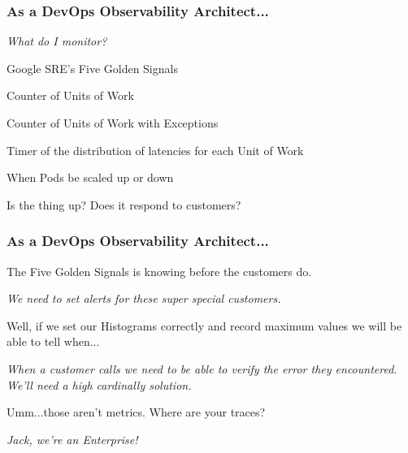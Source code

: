 
\begin{frame}
    \frametitle{As a DevOps Observability Architect...}

    \begin{quotebox}
    \emph{What do I monitor?}
    \end{quotebox}

    Google SRE's  Five Golden Signals
    \begin{description}[labelwidth=\widthof{Saturation}]
        \item[Traffic] Counter of Units of Work
        \item[Errors] Counter of Units of Work with Exceptions
        \item[Latency] Timer of the distribution of latencies for each Unit of Work
        \item[Saturation] When Pods be scaled up or down
        \item[Health] Is the thing up?  Does it respond to customers?
    \end{description}
\end{frame}

\begin{frame}
    \frametitle{As a DevOps Observability Architect...}

    The  Five Golden Signals is knowing before the customers do.

    \begin{quotebox}
        \emph{We need to set alerts for these super special customers.}
    \end{quotebox}

    Well, if we set our Histograms correctly and record maximum values we will
    be able to tell when...

    \begin{quotebox}
        \emph{When a customer calls we need to be able to verify the error
            they encountered.  We'll need a high cardinally solution.}
    \end{quotebox}

    Umm...those aren't metrics.  Where are your traces?

    \begin{quotebox}
        \emph{Jack, we're an Enterprise!}
    \end{quotebox}
\end{frame}


